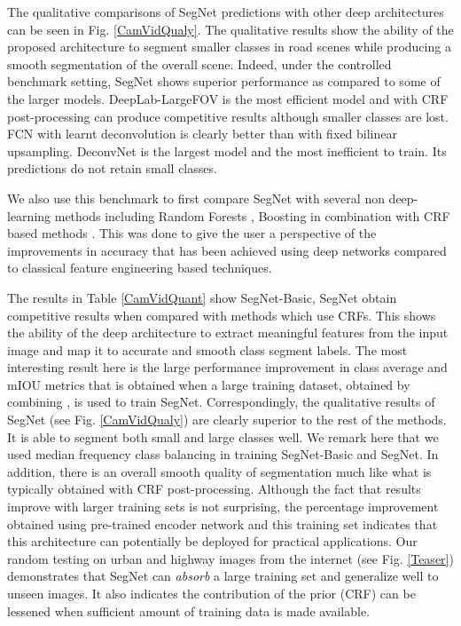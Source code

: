 \documentclass[10pt,journal,compsoc]{IEEEtran}
\begin{document}
The qualitative comparisons of SegNet predictions with other deep architectures can be seen in Fig. \ref{CamVidQualy}. The qualitative results show the ability of the proposed architecture to segment smaller classes in road scenes while producing a smooth segmentation of the overall scene. Indeed, under the controlled benchmark setting, 
SegNet shows superior performance as compared to some of the larger models. DeepLab-LargeFOV is the most efficient model and with CRF post-processing can produce competitive results although smaller classes are lost. FCN with learnt deconvolution is clearly better than with fixed bilinear upsampling. DeconvNet is the largest model and the most inefficient to train. Its predictions do not retain small classes.



We also use this benchmark to first compare SegNet with several non deep-learning methods including Random Forests \cite{Jamie2}, Boosting \cite{Jamie2,Sturgess} in combination with CRF based methods \cite{LadickyECCV}. This was done to give the user a perspective of the improvements in accuracy that has been achieved using deep networks compared to classical feature engineering based techniques. 

The results in Table \ref{CamVidQuant} show SegNet-Basic, SegNet obtain competitive results  when compared with methods which use  CRFs. This shows the ability of the deep architecture to extract meaningful features from the input image and map it to accurate and smooth class segment labels. The most interesting result here is the large  performance improvement in class average and mIOU metrics that is obtained when a large training dataset, obtained by combining \cite{gould2009decomposing,russell2008labelme,GabeDataset,GeigerKITTI}, is used to train SegNet. Correspondingly, the qualitative results of SegNet (see Fig. \ref{CamVidQualy}) are clearly superior to the rest of the methods. It is able to segment both small and large classes well. We remark here that we used median frequency class balancing \cite{eigen2014NIPS} in training SegNet-Basic and SegNet. In addition, there is an overall smooth quality of segmentation much like what is typically obtained with CRF post-processing. Although the fact that results improve with larger training sets is not surprising, the percentage improvement obtained using pre-trained encoder network and this training set indicates that this architecture can potentially be deployed for practical applications. Our random testing on urban and highway images from the internet (see Fig. \ref{Teaser}) demonstrates that SegNet can \textit{absorb} a large training set and generalize well to unseen images. It also indicates the contribution of the prior (CRF) can be lessened when sufficient amount of training data is made available.
\end{document}
